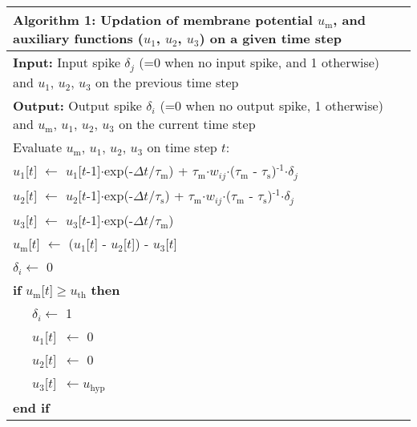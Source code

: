 \documentclass[10pt,journal]{IEEEtran}
\begin{document}
\begin{table}[b]\centering
\begin{threeparttable}\small
\begin{tabular}[ht]{p{8.4cm}}\toprule
    \textbf{Algorithm 1:} Updation of membrane potential $u_\textrm{m}$, and auxiliary functions ($u_\textrm{1}$, $u_\textrm{2}$, $u_\textrm{3}$) on a given time step \\\midrule
    \textbf{Input:} Input spike $\delta_j$ (=0 when no input spike, and 1 otherwise) and $u_\textrm{1}$, $u_\textrm{2}$, $u_\textrm{3}$ on the previous time step \\
    \textbf{Output:} Output spike $\delta_i$ (=0 when no output spike, 1 otherwise) and $u_\textrm{m}$, $u_\textrm{1}$, $u_\textrm{2}$, $u_\textrm{3}$ on the current time step\\ \midrule

    Evaluate $u_\textrm{m}$, $u_\textrm{1}$, $u_\textrm{2}$, $u_\textrm{3}$ on time step $t$:\\
    $u_\textrm{1}$[$t$] $\leftarrow$ $u_\textrm{1}$[$t$-1]$\cdot$exp(-$\Delta t$$\mathbin{/}$$\tau_\textrm{m}$) + $\tau_\textrm{m}$$\cdot$$w_{ij}$$\cdot$($\tau_\textrm{m}$ - $\tau_\textrm{s}$)$^\textrm{-1}$$\cdot$$\delta_j$\\
    $u_\textrm{2}$[$t$] $\leftarrow$ $u_\textrm{2}$[$t$-1]$\cdot$exp(-$\Delta t$$\mathbin{/}$$\tau_\textrm{s}$) + $\tau_\textrm{m}$$\cdot$$w_{ij}$$\cdot$($\tau_\textrm{m}$ - $\tau_\textrm{s}$)$^\textrm{-1}$$\cdot$$\delta_j$\\
    $u_\textrm{3}$[$t$] $\leftarrow$ $u_\textrm{3}$[$t$-1]$\cdot$exp(-$\Delta t$$\mathbin{/}$$\tau_\textrm{m}$)\\
    
    $u_\textrm{m}$[$t$] $\leftarrow$ ($u_\textrm{1}$[$t$] - $u_\textrm{2}$[$t$]) - $u_\textrm{3}$[$t$]\\
    $\delta_i\leftarrow$ 0\\
    
    \textbf{if} $u_\textrm{m}$[$t$]$\geq$$u_\textrm{th}$ \textbf{then}\\
        ~~~$\delta_i\leftarrow$ 1\\
        ~~~$u_\textrm{1}$[$t$]~$\leftarrow$ 0\\
        ~~~$u_\textrm{2}$[$t$]~$\leftarrow$ 0\\
        ~~~$u_\textrm{3}$[$t$]~$\leftarrow u_\textrm{hyp}$\\
\textbf{end if}\\\bottomrule
\end{tabular}
\end{threeparttable}
\end{table} 
\end{document}
